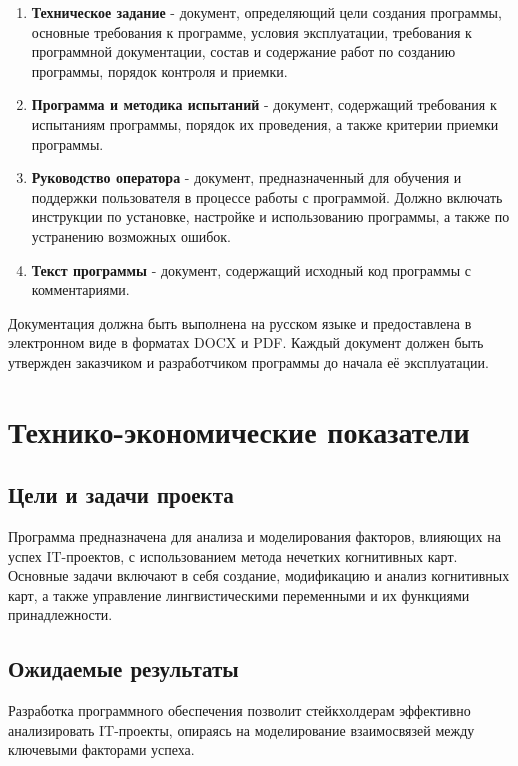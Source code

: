 \documentclass{article}
\begin{document}
    \begin{enumerate}
        \item \textbf{Техническое задание} - документ, определяющий цели создания программы, основные требования к программе, условия эксплуатации, требования к программной документации, состав и содержание работ по созданию программы, порядок контроля и приемки.
        \item \textbf{Программа и методика испытаний} - документ, содержащий требования к испытаниям программы, порядок их проведения, а также критерии приемки программы.
        \item \textbf{Руководство оператора} - документ, предназначенный для обучения и поддержки пользователя в процессе работы с программой. Должно включать инструкции по установке, настройке и использованию программы, а также по устранению возможных ошибок.
        \item \textbf{Текст программы} - документ, содержащий исходный код программы с комментариями.
    \end{enumerate}

    Документация должна быть выполнена на русском языке и предоставлена в электронном виде в форматах DOCX и PDF. Каждый документ должен быть утвержден заказчиком и разработчиком программы до начала её эксплуатации.
    \newpage
    \section {Технико-экономические показатели}

    \subsection{Цели и задачи проекта}
    Программа предназначена для анализа и моделирования факторов, влияющих на успех IT-проектов, с использованием метода нечетких когнитивных карт. Основные задачи включают в себя создание, модификацию и анализ когнитивных карт, а также управление лингвистическими переменными и их функциями принадлежности.

    \subsection{Ожидаемые результаты}
    Разработка программного обеспечения позволит стейкхолдерам эффективно анализировать IT-проекты, опираясь на моделирование взаимосвязей между ключевыми факторами успеха.
\end{document}
